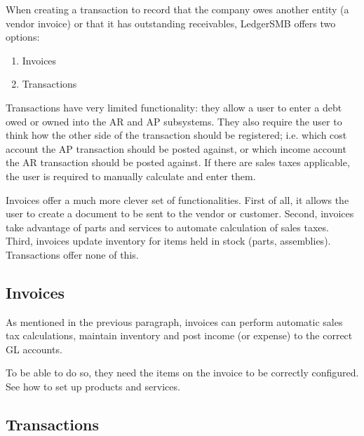 When creating a transaction to record that the company owes another
entity (a vendor invoice) or that it has outstanding receivables,
LedgerSMB offers two options:

\begin{enumerate}
\item Invoices
\item Transactions
\end{enumerate}

Transactions have very limited functionality: they allow a user to enter
a debt owed or owned into the AR and AP subsystems. They also require the
user to think how the other side of the transaction should be registered;
i.e. which cost account the AP transaction should be posted against, or
which income account the AR transaction should be posted against. If there
are sales taxes applicable, the user is required to manually calculate and
enter them.

Invoices offer a much more clever set of functionalities. First of all, it
allows the user to create a document to be sent to the vendor or \gls{customer}.
Second, invoices take advantage of parts and services
to automate calculation of sales taxes. Third, invoices update inventory
for items held in stock (parts, assemblies). Transactions offer none of this.

\subsection{Invoices}
\label{subsec-business-processes-invoicing-manual-entry-invoices}


As mentioned in the previous paragraph, invoices  can perform automatic
sales tax calculations, maintain inventory and post income (or expense)
to the correct GL accounts.

To be able to do so, they need the items on the invoice to be correctly
configured. See  how to set up products
and services.



\subsection{Transactions}
\label{subsec-business-processes-invoicing-manual-entry-transactions}


